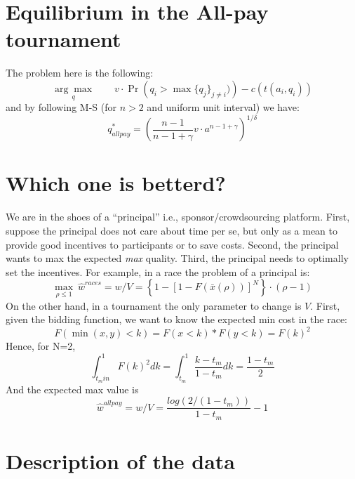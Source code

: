 \documentclass[serif]{amsart}
\begin{document}
\section{Equilibrium in the All-pay tournament}
The problem here is the following:
\[
	\underset{q}{\arg\max} \qquad v \cdot \Pr\left( q_i  > \max \{q_j\}_{j\neq i}) \right) - c(t(a_i,q_i))
\]
and by following M-S (for $n>2$ and uniform unit interval) we have:
\[
	q_{allpay}^* =  \left(\frac{n-1}{n-1+\gamma} v  \cdot a^{n-1+\gamma}\right)^{1/\delta}
\]
 
\section{Which one is betterd?}
We are in the shoes of a ``principal'' i.e., sponsor/crowdsourcing platform.
First, suppose the principal does not care about time per se, but only as a mean to provide good incentives to participants or to save costs. 
Second, the principal wants to max the expected \emph{max} quality. Third, the principal needs to optimally set the incentives. For example, in a race the problem of a principal is:
\[
	\max_{\rho \leq 1} ~ \hat{w}^{races} = w/V =  \left\{1 - [1-F(\bar x(\rho))]^{N} \right\} \cdot (\rho  - 1)
\]
On the other hand, in a tournament the only parameter to change is $V$. 
First, given the bidding function, we want to know the expected min cost in the race:
\[
	F(\min(x,y)<k) = F(x<k)*F(y<k) = F(k)^2
\]
Hence, for N=2,
\[
	\int_{t_min}^1 F(k)^2 d k = \int_{t_m}^1  \frac{k-t_m}{1-t_m} dk   	=  \frac{1 - t_m}2 
\]
And the expected max value  is 
\[
	\hat w^{allpay} = w/V =  \frac{log(2/(1-t_m))}{1-t_m}  - 1
\]


\section{Description of the data}

 
\end{document}
